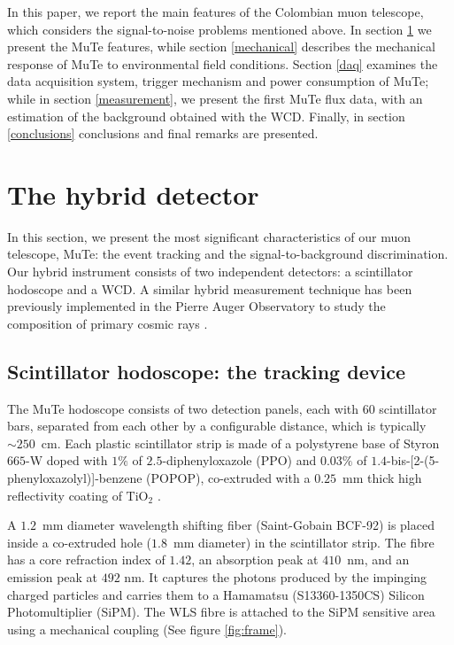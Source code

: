 \documentclass[letterpaper,11pt]{article}
\begin{document}
In this paper, we report the main features of the Colombian muon telescope, which considers the signal-to-noise problems mentioned above. In section \ref{detector} we present the MuTe features, while section \ref{mechanical} describes the mechanical response of MuTe to environmental field conditions. Section \ref{daq} examines the data acquisition system, trigger mechanism and power consumption of MuTe; while in section \ref{measurement}, we present the first MuTe flux data, with an estimation of the background obtained with the WCD. Finally, in section \ref{conclusions} conclusions and final remarks are presented.


\section{The hybrid detector}
\label{detector}
In this section, we present the most significant characteristics of our muon telescope, MuTe: the event tracking and the signal-to-background discrimination. Our hybrid instrument consists of two independent detectors: a scintillator hodoscope and a WCD. A similar hybrid measurement technique has been previously implemented in the Pierre Auger Observatory to study the composition of primary cosmic rays \cite{aab2017muon, aab2016prototype}.

\subsection{Scintillator hodoscope: the tracking device}
The MuTe hodoscope consists of two detection panels, each with $60$ scintillator bars, separated from each other by a configurable distance, which is typically $\sim 250$~cm. Each plastic scintillator strip is made of a polystyrene base of Styron $665$-W doped with $1\%$ of $2.5$-diphenyloxazole (PPO) and $0.03\%$ of $1.4$-bis-[2-(5-phenyloxazolyl)]-benzene (POPOP), co-extruded with a $0.25$~mm thick high reflectivity coating of $\text{TiO}_{\text{2}}$ \cite{PlaDalmau2003}. 

A $1.2$~mm diameter wavelength shifting fiber (Saint-Gobain BCF-92) is placed inside a co-extruded hole ($1.8$~mm diameter) in the scintillator strip. The fibre has a core refraction index of $1.42$, an absorption peak at $410$~nm, and an emission peak at $492$ nm. It captures the photons produced by the impinging charged particles and carries them to a Hamamatsu (S13360-1350CS) Silicon Photomultiplier (SiPM). The WLS fibre is attached to the SiPM sensitive area using a mechanical coupling (See figure \ref{fig:frame}). 
\end{document}
